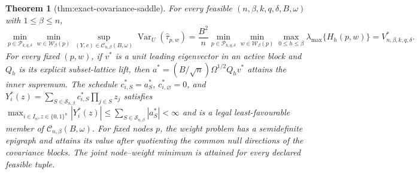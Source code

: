 \documentclass{article}
\newtheorem{theorem}{Theorem}
\begin{document}
\begin{theorem}[thm:exact-covariance-saddle]\label{thm:exact-covariance-saddle}
For every feasible \((n,\beta,k,q,\delta,B,\omega)\) with \(1\le\beta\le n\),
\[
\min_{p\in\mathcal P_{k,q,\delta}}\min_{w\in\mathcal W_\beta(p)}\sup_{(Y,c)\in\mathcal C_{n,\beta}(B,\omega)}\operatorname{Var}_U(\widehat\tau_{p,w})=\frac{B^2}{n}\min_{p\in\mathcal P_{k,q,\delta}}\min_{w\in\mathcal W_\beta(p)}\max_{0\le h\le\beta}\lambda_{\max}\{H_h(p,w)\}=V^*_{n,\beta,k,q,\delta}.
\]
For every fixed \((p,w)\), if \(v^*\) is a unit leading eigenvector in an active block and \(Q_h\) is its explicit subset-lattice lift, then \(a^*=(B/\sqrt n)\Omega^{1/2}Q_hv^*\) attains the inner supremum. The schedule \(c^*_{i,S}=a^*_S\), \(c^*_{i,\varnothing}=0\), and \(Y_i^*(z)=\sum_{S\in\mathcal S_{n,\beta}}c^*_{i,S}\prod_{j\in S}z_j\) satisfies \(\max_{i\in I_n,z\in\{0,1\}^n}|Y_i^*(z)|\le\sum_{S\in\mathcal S_{n,\beta}}|a_S^*|<\infty\) and is a legal least-favourable member of \(\mathcal C_{n,\beta}(B,\omega)\). For fixed nodes \(p\), the weight problem has a semidefinite epigraph and attains its value after quotienting the common null directions of the covariance blocks.  The joint node--weight minimum is attained for every declared feasible tuple.
\end{theorem}
\end{document}

